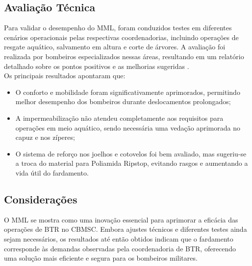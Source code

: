 \begin{centering}
\end{centering}

\subsection{Avaliação Técnica}

Para validar o desempenho do \acrlong{MML}, foram conduzidos testes em diferentes cenários operacionais pelas respectivas coordenadorias, incluindo operações de resgate aquático, salvamento em altura e corte de árvores. A avaliação foi realizada por bombeiros especializados nessas áreas, resultando em um relatório detalhado sobre os pontos positivos e as melhorias sugeridas \cite{relMML}.
\\
Os principais resultados apontaram que:
\begin{itemize}
    \item O conforto e mobilidade foram significativamente aprimorados, permitindo melhor desempenho dos bombeiros durante deslocamentos prolongados;
    \item A impermeabilização não atendeu completamente aos requisitos para operações em meio aquático, sendo necessária uma vedação aprimorada no capuz e nos zíperes;
    \item O sistema de reforço nos joelhos e cotovelos foi bem avaliado, mas sugeriu-se a troca do material para Poliamida Ripstop, evitando rasgos e aumentando a vida útil do fardamento.
\end{itemize}

    

\subsection{Considerações}
O \acrlong{MML} se mostra como uma inovação essencial para aprimorar a eficácia das operações de \acrlong{BTR} no \acrshort{CBMSC}. Embora ajustes técnicos e diferentes testes ainda sejam necessários, os resultados até então obtidos indicam que o fardamento corresponde às demandas observadas pela coordenadoria de \acrshort{BTR}, oferecendo uma solução mais eficiente e segura para os bombeiros militares.